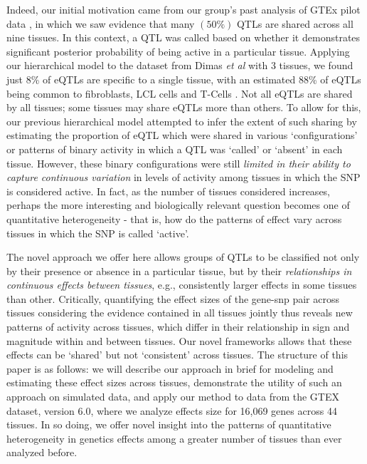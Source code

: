 Indeed, our initial motivation came from our group's past analysis of GTEx pilot data \cite{consortium_genotype-tissue_2015}, in which we saw evidence that many $(50\%)$ QTLs are shared across all nine tissues. In this context, a QTL was called based on whether it demonstrates significant posterior probability of being active in a particular tissue. Applying our hierarchical model to the dataset from Dimas {\it et al} \cite{dimas_common_2009} with 3 tissues, we found just 8\% of eQTLs are specific to a single tissue, with an estimated 88\% of eQTLs being common to fibroblasts, LCL cells and T-Cells \cite{flutre_statistical_2013}. Not all eQTLs are shared by all tissues; some tissues may share eQTLs more than others. To allow for this, our previous hierarchical model attempted to infer the extent of such sharing by estimating the proportion of eQTL which were shared in various `configurations' or patterns of binary activity in which a QTL was `called' or `absent' in each tissue.
 However, these binary configurations were still \textit{limited in their ability to capture continuous variation} in levels of activity among tissues in which the SNP is considered active. 
 In fact, as the number of tissues considered increases, perhaps the more interesting and biologically relevant question becomes one of quantitative heterogeneity - that is, how do the patterns of effect vary across tissues in which the SNP is called `active'.  

The novel approach we offer here allows groups of QTLs to be classified not only by their presence or absence in a particular tissue, but by their  \textit{relationships in continuous effects between tissues}, e.g., consistently larger effects in some tissues than other. Critically, quantifying the effect sizes of the gene-snp pair across tissues considering the evidence contained in all tissues jointly thus reveals new patterns of activity across tissues, which differ in their relationship in sign and magnitude within and between tissues. Our novel frameworks allows that these effects can be `shared' but not `consistent' across tissues. The structure of this paper is as follows: we will describe our approach in brief for modeling and estimating these effect sizes across tissues, demonstrate the utility of such an approach on simulated data, and apply our method to data from the GTEX dataset, version 6.0, where we analyze effects size for 16,069 genes across 44 tissues. In so doing, we offer novel insight into the patterns of quantitative heterogeneity in genetics effects among a greater number of tissues than ever analyzed before.
